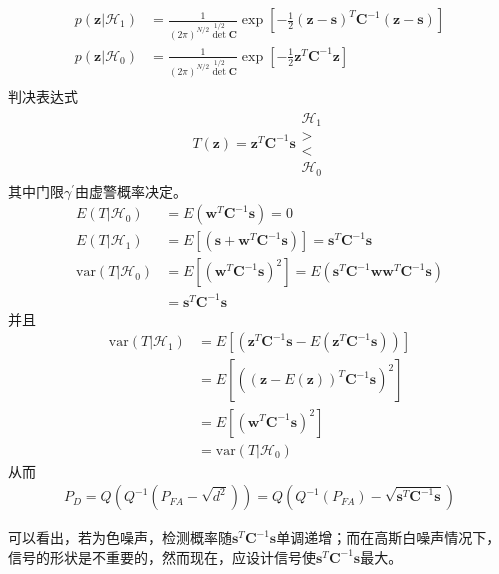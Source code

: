 \documentclass[fontset=windows]{article}
\numberwithin{figure}{section}
\begin{document}
\begin{align*}
	p(\mathbf{z}|\mathcal{H}_1) & =\frac{1}{(2\pi )^{N/2}\det^{1/2}\mathbf{C}}
	\exp \left[-\frac{1}{2}(\mathbf{z}-\mathbf{s})^T\mathbf{C}^{-1}(\mathbf{z}-\mathbf{s})\right] \\
	p(\mathbf{z}|\mathcal{H}_0) & =\frac{1}{(2\pi )^{N/2}\det^{1/2}\mathbf{C}}
	\exp \left[-\frac{1}{2}\mathbf{z}^T\mathbf{C}^{-1}\mathbf{z}\right]                           \\
\end{align*}
判决表达式
\begin{align*}
	T(\mathbf{z})=\mathbf{z}^T\mathbf{C}^{-1}\mathbf{s}
	\begin{matrix}
		\mathcal{H}_1 \\>\\<\\\mathcal{H}_0
	\end{matrix}
\end{align*}
其中门限\(\gamma^{\prime}\)由虚警概率决定。
\begin{align*}
	E(T|\mathcal{H}_0)
	 & =E(\mathbf{w}^T\mathbf{C}^{-1}\mathbf{s})=0                        \\
	E(T|\mathcal{H}_1)
	 & =E\left[(\mathbf{s}+\mathbf{w}^T\mathbf{C}^{-1}\mathbf{s})\right]
	=\mathbf{s}^T\mathbf{C}^{-1}\mathbf{s}                                \\
	\text{var}(T|\mathcal{H}_0)
	 & =E\left[(\mathbf{w}^T\mathbf{C}^{-1}\mathbf{s})^2\right]
	=E(\mathbf{s}^T\mathbf{C}^{-1}\mathbf{ww}^T\mathbf{C}^{-1}\mathbf{s}) \\
	 & =\mathbf{s}^T\mathbf{C}^{-1}\mathbf{s}
\end{align*}
并且
\begin{align*}
	\text{var}(T|\mathcal{H}_1)
	 & =E\left[(\mathbf{z}^T\mathbf{C}^{-1}\mathbf{s}-E(\mathbf{z}^T\mathbf{C}^{-1}\mathbf{s})) \right] \\
	 & =E\left[((\mathbf{z}-E(\mathbf{z}))^T\mathbf{C}^{-1}\mathbf{s})^2\right]                         \\
	 & =E[(\mathbf{w}^T\mathbf{C}^{-1}\mathbf{s})^2]                                                    \\
	 & =\text{var}(T|\mathcal{H}_0)
\end{align*}
从而
\begin{align*}
	P_D=Q(Q^{-1}(P_{FA}-\sqrt{d^2}))=Q(Q^{-1}(P_{FA})-\sqrt{\mathbf{s}^T\mathbf{C}^{-1}\mathbf{s}})
\end{align*}

可以看出，若为色噪声，检测概率随\(\mathbf{s}^T\mathbf{C}^{-1}\mathbf{s}\)单调递增；而在高斯白噪声情况下，信号的形状是不重要的，然而现在，应设计信号使\(\mathbf{s}^T\mathbf{C}^{-1}\mathbf{s}\)最大。
\end{document}
